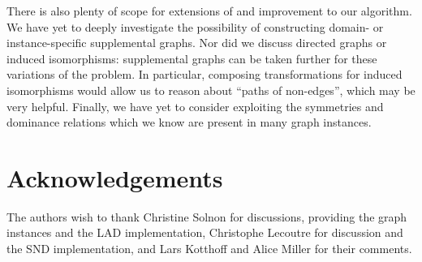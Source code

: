 \documentclass{llncs}
\begin{document}
There is also plenty of scope for extensions of and improvement to our algorithm. We have yet to
deeply investigate the possibility of constructing domain- or instance-specific supplemental graphs.
Nor did we discuss directed graphs or induced isomorphisms: supplemental graphs can be taken further
for these variations of the problem.  In particular, composing transformations for induced
isomorphisms would allow us to reason about ``paths of non-edges'', which may be very helpful.
Finally, we have yet to consider exploiting the symmetries and dominance relations which we know are
present in many graph instances.

\section*{Acknowledgements}

The authors wish to thank Christine Solnon for discussions, providing the graph instances and the
LAD implementation, Christophe Lecoutre for discussion and the SND implementation, and Lars Kotthoff
and Alice Miller for their comments.

\FloatBarrier


\end{document}
